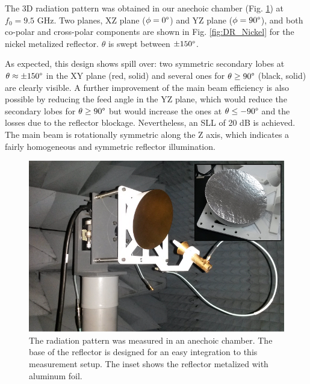 \documentclass{IEEEtran}
\begin{document}
The 3D radiation pattern was obtained in our anechoic chamber (Fig. \ref{fig:DR_Setup}) at $f_0=9.5$ GHz. Two planes, XZ plane ($\phi=0\degree$) and YZ plane ($\phi=90\degree$), and both co-polar and cross-polar components are shown in Fig. \ref{fig:DR_Nickel} for the nickel metalized reflector.  $\theta$ is swept between $\pm 150\degree$.

As expected, this design shows spill over: two symmetric secondary lobes at $\theta\approx\pm 150\degree$ in the XY plane (red, solid) and several ones for $\theta\geq90\degree$ (black, solid) are clearly visible. A further improvement of the main beam efficiency is also possible by reducing the feed angle in the YZ plane, which would reduce the secondary lobes for $\theta\geq90\degree$ but would increase the ones at $\theta\leq-90\degree$ and the losses due to the reflector blockage. Nevertheless, an SLL of 20 dB is achieved. The main beam is rotationally symmetric along the Z axis, which indicates a fairly homogeneous and symmetric reflector illumination.

\begin{figure}[h]
	\centerline{\includegraphics[width=0.7\columnwidth]{images/DR_Meas_.png}}
	\caption{The radiation pattern was measured in an anechoic chamber. The base of the reflector is designed for an easy integration to this measurement setup. The inset shows the reflector metalized with aluminum foil.}
	\label{fig:DR_Setup}
\end{figure}
\end{document}
